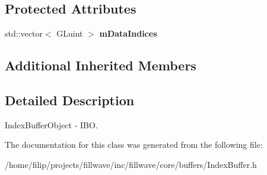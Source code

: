 \subsection*{Protected Attributes}
\begin{DoxyCompactItemize}
\item 
\mbox{\label{classflw_1_1flc_1_1IndexBuffer_a381007fe9db407c570104bdbd7f7d810}} 
std\+::vector$<$ G\+Luint $>$ {\bfseries m\+Data\+Indices}
\end{DoxyCompactItemize}
\subsection*{Additional Inherited Members}


\subsection{Detailed Description}
Index\+Buffer\+Object -\/ I\+BO. 

The documentation for this class was generated from the following file\+:\begin{DoxyCompactItemize}
\item 
/home/filip/projects/fillwave/inc/fillwave/core/buffers/Index\+Buffer.\+h\end{DoxyCompactItemize}
